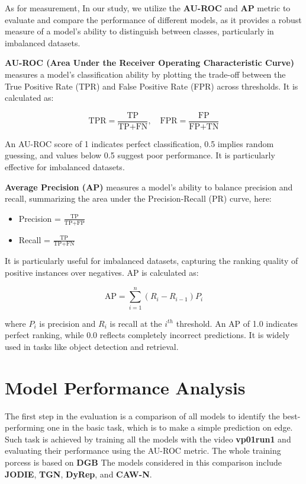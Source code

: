 As for measurement, In our study, we utilize the \textbf{AU-ROC} and \textbf{AP} metric to evaluate and compare the performance of different models, as it provides a robust measure of a model's ability to distinguish between classes, particularly in imbalanced datasets. 

\textbf{AU-ROC (Area Under the Receiver Operating Characteristic Curve)} measures a model's classification ability by plotting the trade-off between the True Positive Rate (TPR) and False Positive Rate (FPR) across thresholds. It is calculated as: 

\[
\text{TPR} = \frac{\text{TP}}{\text{TP} + \text{FN}}, \quad \text{FPR} = \frac{\text{FP}}{\text{FP} + \text{TN}}
\]

An AU-ROC score of 1 indicates perfect classification, 0.5 implies random guessing, and values below 0.5 suggest poor performance. 
It is particularly effective for imbalanced datasets.

\textbf{Average Precision (AP)} measures a model's ability to balance precision and recall, summarizing the area under the Precision-Recall (PR) curve, here:
\begin{itemize}
    \item Precision = $\frac{\text{TP}}{\text{TP} + \text{FP}}$
    \item Recall = $\frac{\text{TP}}{\text{TP} + \text{FN}}$
\end{itemize}
It is particularly useful for imbalanced datasets, capturing the ranking quality of positive instances over negatives. AP is calculated as:

\[
\text{AP} = \sum_{i=1}^n \left( R_i - R_{i-1} \right) P_i
\]


where $P_i$ is precision and $R_i$ is recall at the $i^{th}$ threshold. An AP of 1.0 indicates perfect ranking, while 0.0 reflects completely incorrect predictions. It is widely used in tasks like object detection and retrieval.



\section{Model Performance Analysis}


The first step in the evaluation is a comparison of all models to identify the best-performing one in the basic task, which is to make a simple prediction on edge. Such task is achieved by training all the models with the video \textbf{vp01run1} and evaluating their performance using the AU-ROC metric. The whole training porcess is based on \textbf{DGB}\cite{poursafaei2022towards} The models considered in this comparison include \textbf{JODIE}, \textbf{TGN}, \textbf{DyRep}, and \textbf{CAW-N}.

